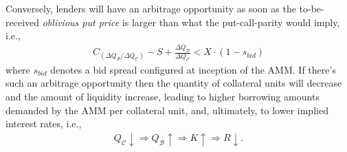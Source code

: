 \documentclass[a4paper]{article}
\begin{document}
Conversely, lenders will have an arbitrage opportunity as soon as the to-be-received \emph{oblivious put price} is larger than what the put-call-parity would imply, i.e.,
\begin{equation}
\label{eq:option_premium_lenders}
\begin{split}
C_{(\Delta Q_\mathcal{B} / \Delta Q_\mathcal{C})} - S + \frac{\Delta Q_\mathcal{B}}{\Delta Q_\mathcal{C}} < X \cdot (1-s_{bid})
\end{split}
\end{equation}
where $s_{bid}$ denotes a bid spread configured at inception of the AMM. If there's such an arbitrage opportunity then the quantity of collateral units will decrease and the amount of liquidity increase, leading to higher borrowing amounts demanded by the AMM per collateral unit, and, ultimately, to lower implied interest rates, i.e.,
\begin{equation}
\begin{split}
Q_\mathcal{C}\downarrow \Rightarrow Q_\mathcal{B}\uparrow \Rightarrow K\uparrow \Rightarrow R\downarrow.
\end{split}
\end{equation}
\end{document}
